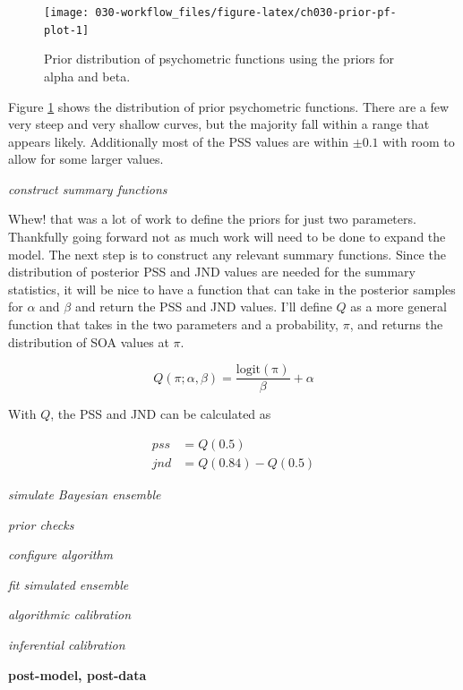 \documentclass[11pt, oneside, openany]{scrbook}
\begin{document}
\begin{figure}

{\centering \texttt{[image: 030-workflow\_files/figure-latex/ch030-prior-pf-plot-1]} 

}

\caption{Prior distribution of psychometric functions using the priors for alpha and beta.}\label{fig:ch030-prior-pf-plot}
\end{figure}

Figure \ref{fig:ch030-prior-pf-plot} shows the distribution of prior psychometric functions. There are a few very steep and very shallow curves, but the majority fall within a range that appears likely. Additionally most of the PSS values are within \(\pm 0.1\) with room to allow for some larger values.

\emph{construct summary functions}

Whew! that was a lot of work to define the priors for just two parameters. Thankfully going forward not as much work will need to be done to expand the model. The next step is to construct any relevant summary functions. Since the distribution of posterior PSS and JND values are needed for the summary statistics, it will be nice to have a function that can take in the posterior samples for \(\alpha\) and \(\beta\) and return the PSS and JND values. I'll define \(Q\) as a more general function that takes in the two parameters and a probability, \(\pi\), and returns the distribution of SOA values at \(\pi\).

\begin{equation}
  Q(\pi; \alpha, \beta) = \frac{\mathrm{logit(\pi)}}{\beta} + \alpha
  \label{eq:summfun1}
\end{equation}

With \(Q\), the PSS and JND can be calculated as

\begin{align}
  pss &= Q(0.5) \\
  jnd &= Q(0.84) - Q(0.5)
\end{align}

\emph{simulate Bayesian ensemble}

\emph{prior checks}

\emph{configure algorithm}

\emph{fit simulated ensemble}

\emph{algorithmic calibration}

\emph{inferential calibration}

\textbf{post-model, post-data}
\end{document}
